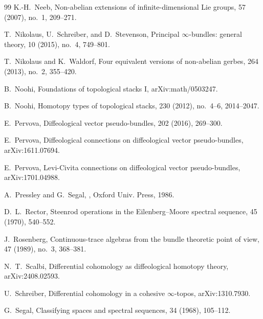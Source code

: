 \documentclass[11pt]{amsart}
\begin{document}
\begin{thebibliography}{99}
K.-H.~Neeb,
\newblock Non-abelian extensions of infinite-dimensional Lie groups,
 57 (2007), no.~1, 209--271.

T.~Nikolaus, U.~Schreiber, and D.~Stevenson,
\newblock Principal $\infty$-bundles: general theory,
 10 (2015), no.~4, 749--801.

T.~Nikolaus and K.~Waldorf,
\newblock Four equivalent versions of non-abelian gerbes,
 264 (2013), no.~2, 355--420.

B.~Noohi,
\newblock Foundations of topological stacks I,
\newblock arXiv:math/0503247.

B.~Noohi,
\newblock Homotopy types of topological stacks,
 230 (2012), no.~4--6, 2014--2047.

E.~Pervova,
\newblock Diffeological vector pseudo-bundles,
 202 (2016), 269--300.

E.~Pervova,
\newblock Diffeological connections on diffeological vector pseudo-bundles,
\newblock arXiv:1611.07694.

E.~Pervova,
\newblock Levi-Civita connections on diffeological vector pseudo-bundles,
\newblock arXiv:1701.04988.

A.~Pressley and G.~Segal,
,
\newblock Oxford Univ. Press, 1986.

D.~L.~Rector,
\newblock Steenrod operations in the Eilenberg--Moore spectral sequence,
 45 (1970), 540--552.


J.~Rosenberg,
\newblock Continuous-trace algebras from the bundle theoretic point of view,
 47 (1989), no.~3, 368--381.

N.~T.~Scalbi,
\newblock Differential cohomology as diffeological homotopy theory,
\newblock arXiv:2408.02593.

U.~Schreiber,
\newblock Differential cohomology in a cohesive $\infty$-topos,
\newblock arXiv:1310.7930.

G.~Segal,
\newblock Classifying spaces and spectral sequences,
 34 (1968), 105--112.


\end{thebibliography}
\end{document}
